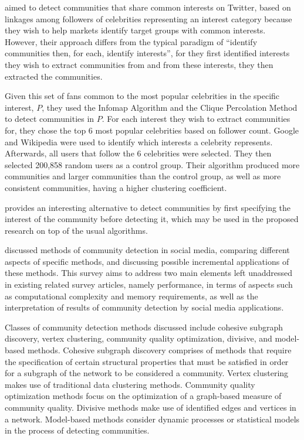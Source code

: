  aimed to detect communities that share common interests on Twitter, based on linkages among followers of celebrities representing an interest category because they wish to help markets identify target groups with common interests. However, their approach differs from the typical  paradigm of ``identify communities then, for each, identify interests'', for they first identified interests they wish to extract communities from and from these interests, they then extracted the communities. 

Given this set of fans common to the most popular celebrities in the specific interest, $P$, they used the Infomap Algorithm and the Clique Percolation Method to detect communities in $P$. For each interest they wish to extract communities for, they chose the top 6 most popular celebrities based on follower count. Google and Wikipedia were used to identify which interests a celebrity represents. Afterwards, all users that follow the 6 celebrities were selected. They then selected 200,858 random users as a control group. Their algorithm produced more communities and larger communities than the control group, as well as more consistent communities, having a higher clustering coefficient. 

 provides an interesting alternative to detect communities by first specifying the interest of the community before detecting it, which may be used in the proposed research on top of the usual algorithms.

 discussed methods of community detection in social media, comparing different aspects of specific methods, and discussing possible incremental applications of these methods. This survey aims to address two main elements left unaddressed in existing related survey articles, namely performance, in terms of aspects such as computational complexity and memory requirements, as well as the interpretation of results of community detection by social media applications.

Classes of community detection methods discussed include cohesive subgraph discovery, vertex clustering, community quality optimization, divisive, and model-based methods. Cohesive subgraph discovery comprises of methods that require the specification of certain structural properties that must be satisfied in order for a subgraph of the network to be considered a community. Vertex clustering makes use of traditional data clustering methods. Community quality optimization methods focus on the optimization of a graph-based measure of community quality. Divisive methods make use of identified edges and vertices in a network. Model-based methods consider dynamic processes or statistical models in the process of detecting communities.

